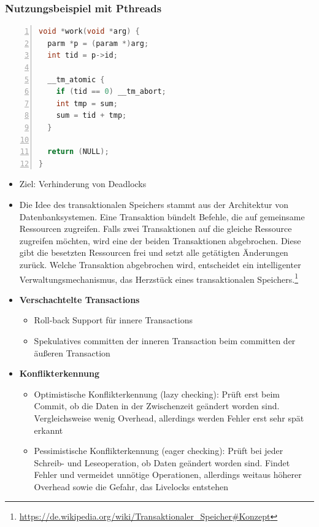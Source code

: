 \subsubsection{Nutzungsbeispiel mit Pthreads}
\begin{minipage}{\linewidth}
\lstset{language=Python}  
\begin{lstlisting}[frame=single,numbers=left,mathescape,keepspaces=true,showstringspaces=false,language=C]
void *work(void *arg) {
  parm *p = (param *)arg;
  int tid = p->id;

  __tm_atomic {
    if (tid == 0) __tm_abort;
    int tmp = sum;
    sum = tid + tmp;
  }

  return (NULL);
}
\end{lstlisting}
\end{minipage}

\begin{itemize}
	\item Ziel: Verhinderung von Deadlocks
	\item Die Idee des transaktionalen Speichers stammt aus der Architektur von Datenbanksystemen. Eine Transaktion bündelt Befehle, die auf gemeinsame Ressourcen zugreifen. Falls zwei Transaktionen auf die gleiche Ressource zugreifen möchten, wird eine der beiden Transaktionen abgebrochen. Diese gibt die besetzten Ressourcen frei und setzt alle getätigten Änderungen zurück. Welche Transaktion abgebrochen wird, entscheidet ein intelligenter Verwaltungsmechanismus, das Herzstück eines transaktionalen Speichers.\footnote{\url{https://de.wikipedia.org/wiki/Transaktionaler_Speicher\#Konzept}}
	\item \textbf{Verschachtelte Transactions}
	\begin{itemize}
		\item Roll-back Support für innere Transactions
		\item Spekulatives committen der inneren Transaction beim committen der äußeren Transaction
	\end{itemize}
	\item \textbf{Konflikterkennung}
	\begin{itemize}
		\item Optimistische Konflikterkennung (lazy checking): Prüft erst beim Commit, ob die Daten in der Zwischenzeit geändert worden sind. Vergleichsweise wenig Overhead, allerdings werden Fehler erst sehr spät erkannt
		\item Pessimistische Konflikterkennung (eager checking): Prüft bei jeder Schreib- und Leseoperation, ob Daten geändert worden sind. Findet Fehler und vermeidet unnötige Operationen, allerdings weitaus höherer Overhead sowie die Gefahr, das Livelocks entstehen

\end{itemize}
\end{itemize}
